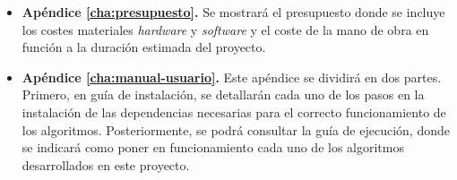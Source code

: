 \begin{itemize}
    \item \textbf{Apéndice \ref{cha:presupuesto}.} Se mostrará el presupuesto donde se incluye los costes materiales \textit{hardware} y \textit{software} y el coste de la mano de obra en función a la duración estimada del proyecto.
    \item \textbf{Apéndice \ref{cha:manual-usuario}.} Este apéndice se dividirá en dos partes. Primero, en guía de instalación, se detallarán cada uno de los pasos en la instalación de las dependencias necesarias para el correcto funcionamiento de los algoritmos. Posteriormente, se podrá consultar la guía de ejecución, donde se indicará como poner en funcionamiento cada uno de los algoritmos desarrollados en este proyecto.
\end{itemize}




